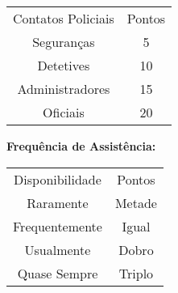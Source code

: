 \documentclass[a4paper]{article}
\begin{document}
\begin{description}
\begin{table}[h]
 \centering
 {\renewcommand\arraystretch{1.25}
 \begin{tabular}{ l l }
  \cline{1-1}\cline{2-2}  
    \multicolumn{1}{|c|}{Contatos Policiais \centering } &
    \multicolumn{1}{c|}{Pontos \centering }
  \\  
  \cline{1-1}\cline{2-2}  
    \multicolumn{1}{|c|}{Seguranças \centering } &
    \multicolumn{1}{c|}{5 \centering }
  \\  
  \cline{1-1}\cline{2-2}  
    \multicolumn{1}{|c|}{Detetives \centering } &
    \multicolumn{1}{c|}{10 \centering }
  \\  
  \cline{1-1}\cline{2-2}  
    \multicolumn{1}{|c|}{Administradores \centering } &
    \multicolumn{1}{c|}{15 \centering }
  \\  
  \cline{1-1}\cline{2-2}  
    \multicolumn{1}{|c|}{Oficiais \centering } &
    \multicolumn{1}{c|}{20 \centering }
  \\  
  \hline

 \end{tabular} }
\end{table}

\textbf{Frequência de Assistência:}


\begin{table}[h]
 \centering
 {\renewcommand\arraystretch{1.25}
 \begin{tabular}{ l l }
  \cline{1-1}\cline{2-2}  
    \multicolumn{1}{|c|}{Disponibilidade \centering } &
    \multicolumn{1}{c|}{Pontos \centering }
  \\  
  \cline{1-1}\cline{2-2}  
    \multicolumn{1}{|c|}{Raramente \centering } &
    \multicolumn{1}{c|}{Metade \centering }
  \\  
  \cline{1-1}\cline{2-2}  
    \multicolumn{1}{|c|}{Frequentemente \centering } &
    \multicolumn{1}{c|}{Igual \centering }
  \\  
  \cline{1-1}\cline{2-2}  
    \multicolumn{1}{|c|}{Usualmente \centering } &
    \multicolumn{1}{c|}{Dobro \centering }
  \\  
  \cline{1-1}\cline{2-2}  
    \multicolumn{1}{|c|}{Quase Sempre \centering } &
    \multicolumn{1}{c|}{Triplo \centering }
  \\  
  \hline

 \end{tabular} }
\end{table}


\end{description}
\end{document}
